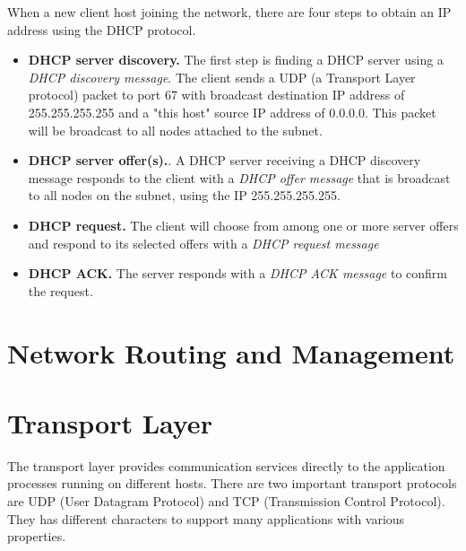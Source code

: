 \documentclass[a4paper, 11pt]{article}
\begin{document}
When a new client host joining the network, there are four steps to obtain an IP address using the DHCP protocol.\\

\begin{itemize}
\item \textbf{DHCP server discovery.} The first step is finding a DHCP server using a \textit{DHCP discovery message}. The client sends a UDP (a Transport Layer protocol) packet to port 67 with broadcast destination IP address of 255.255.255.255 and a "this host" source IP address of 0.0.0.0. This packet will be broadcast to all nodes attached to the subnet.
\item \textbf{DHCP server offer(s).}. A DHCP server receiving a DHCP discovery message responds to the client with a \textit{DHCP offer message} that is broadcast to all nodes on the subnet, using the IP 255.255.255.255.
\item \textbf{DHCP request.} The client will choose from among one or more server offers and respond to its selected offers with a \textit{DHCP request message}
\item \textbf{DHCP ACK.} The server responds with a \textit{DHCP ACK message} to confirm the request.
\end{itemize}

\clearpage
\section{Network Routing and Management}

\clearpage
\section{Transport Layer}

The transport layer provides communication services directly to the application processes running on different hosts. There are two important transport protocols are UDP (User Datagram Protocol) and TCP (Transmission Control Protocol). They has different characters to support many applications with various properties.\\
\end{document}
